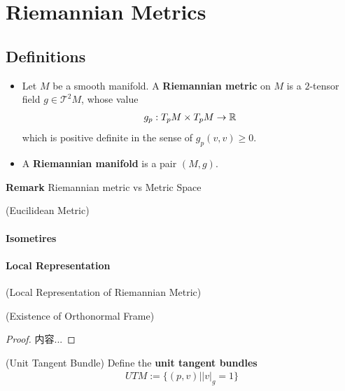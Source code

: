 \documentclass[Total.tex]{subfiles}
\begin{document}
	
	\chapter{Riemannian Metrics}
		\section{Definitions}
			\begin{Def}
				\begin{itemize}
					\item Let $M$ be a smooth manifold. A \textbf{Riemannian metric} on $M$ is a $2$-tensor field $g\in \mathcal{T}^2M$, whose value
					\begin{gather*}
						g_p:T_p M\times T_p M\rightarrow \mathbb{R}
					\end{gather*}
					which is positive definite in the sense of $g_p(v,v)\geq 0$. 
					\item A \textbf{Riemannian manifold} is a pair $(M,g)$.
				\end{itemize}
			\end{Def}
			
			\textbf{Remark} Riemannian metric vs Metric Space
			
			\begin{example}
				(Eucilidean Metric) 
			\end{example}
			\subsubsection{Isometires}
			\subsubsection{Local Representation}
				\begin{Def}
					(Local Representation of Riemannian Metric)
				\end{Def}
				
				
				\begin{proposition}
					(Existence of Orthonormal Frame)
				\end{proposition}
				\begin{proof}
					内容...
				\end{proof}
				\begin{Def}
					(Unit Tangent Bundle)   Define the \textbf{unit tangent bundles}
					\begin{gather*}
						UTM:=\{(p,v)||v|_g=1\}
					\end{gather*}
				\end{Def}
				
\end{document}

